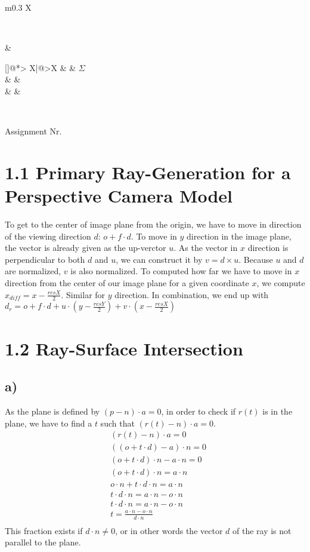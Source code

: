 \documentclass[a4paper]{scrartcl}
\makeatletter
\def\header#1#2{
  \begin{center}
    {\Large Assignment #1}\\
  \end{center}
}
\newcounter{punktelistectr}
\newcounter{punkte}
\newcommand{\punkteliste}[2]{%
  \setcounter{punkte}{#2}%
  \addtocounter{punkte}{-#1}%
  \stepcounter{punkte}%
  \begin{center}%
  \begin{tabularx}{\linewidth}[]{@{}*{\thepunkte}{>{\centering\arraybackslash} X|}@{}>{\centering\arraybackslash}X}
      \forloop{punktelistectr}{#1}{\value{punktelistectr} < #2 } %
      {%
        \thepunktelistectr &
      }
      #2 &  $\Sigma$ \\
      \hline
      \forloop{punktelistectr}{#1}{\value{punktelistectr} < #2 } %
      {%
        &
      } &\\
      \forloop{punktelistectr}{#1}{\value{punktelistectr} < #2 } %
      {%
        &
      } &\\
    \end{tabularx}
  \end{center}
}
\makeatother
\begin{document}
\begin{tabularx}{\linewidth}{m{0.3 \linewidth}X}
  \begin{minipage}{\linewidth}
    \STUDENTA\\
    \STUDENTB
  \end{minipage} & \begin{minipage}{\linewidth}
    \punkteliste{1}{\EXERCISES}
  \end{minipage}\\
\end{tabularx}
\header{Nr. \NUMBER}{\DEADLINE}


\section*{1.1 Primary Ray-Generation for a Perspective Camera Model}
To get to the center of image plane from the origin, we have to move in
direction of the viewing direction $d$: $o+f\cdot d$. To move in $y$ direction
in the image plane, the vector is already given as the up-verctor $u$. As the
vector in $x$ direction is perpendicular to both $d$ and $u$, we can construct
it by $v=d\times u$. Because $u$ and $d$ are normalized, $v$ is also normalized.
To computed how far we have to move in $x$ direction from the center of our
image plane for a given coordinate $x$, we compute $x_{diff}=x-\frac{resX}{2}$.
Similar for $y$ direction. In combination, we end up with $d_r = o + f \cdot d+
u \cdot (y-\frac{resY}{2}) + v \cdot (x-\frac{resX}{2})$

\section*{1.2 Ray-Surface Intersection}
    \subsection*{a)}
        As the plane is defined by $(p-n)\cdot a=0$, in order to check if $r(t)$
        is in the plane, we have to find a $t$ such that $(r(t)-n)\cdot a=0$.
        \begin{align*}
            &(r(t)-n)\cdot a=0\\
            &((o+t\cdot d)-a)\cdot n=0\\
            &(o+t\cdot d) \cdot n -a\cdot n=0\\
            &(o+t\cdot d) \cdot n =a\cdot n\\
            &o\cdot n+t\cdot d\cdot n =a\cdot n\\
            &t\cdot d\cdot n =a\cdot n-o\cdot n\\
            &t\cdot d\cdot n =a\cdot n-o\cdot n\\
            &t=\frac{a\cdot n-o\cdot n}{d\cdot n}\\
        \end{align*}
        This fraction exists if $d\cdot n \neq 0$, or in other words the vector
        $d$ of the ray is not parallel to the plane. 
\end{document}

